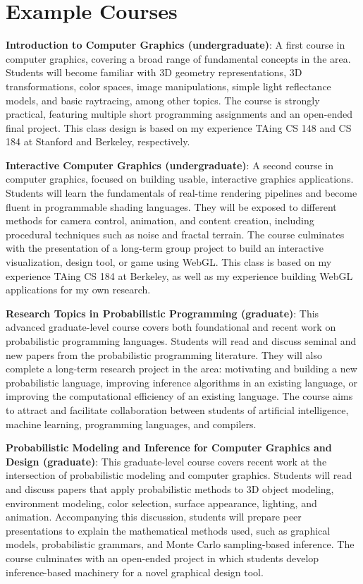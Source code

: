 \documentclass[
10pt, %
a4paper, %
oneside, %
headinclude,footinclude, %
BCOR5mm, %
]{scrartcl}
\begin{document}
\section*{Example Courses}

\textbf{Introduction to Computer Graphics (undergraduate)}:
A first course in computer graphics, covering a broad range of fundamental concepts in the area. Students will become familiar with 3D geometry representations, 3D transformations, color spaces, image manipulations, simple light reflectance models, and basic raytracing, among other topics. The course is strongly practical, featuring multiple short programming assignments and an open-ended final project. This class design is based on my experience TAing CS 148 and CS 184 at Stanford and Berkeley, respectively.

\textbf{Interactive Computer Graphics (undergraduate)}:
A second course in computer graphics, focused on building usable, interactive graphics applications. Students will learn the fundamentals of real-time rendering pipelines and become fluent in programmable shading languages. They will be exposed to different methods for camera control, animation, and content creation, including procedural techniques such as noise and fractal terrain. The course culminates with the presentation of a long-term group project to build an interactive visualization, design tool, or game using WebGL. This class is based on my experience TAing CS 184 at Berkeley, as well as my experience building WebGL applications for my own research.

\textbf{Research Topics in Probabilistic Programming (graduate)}:
This advanced graduate-level course covers both foundational and recent work on probabilistic programming languages. Students will read and discuss seminal and new papers from the probabilistic programming literature. They will also complete a long-term research project in the area: motivating and building a new probabilistic language, improving inference algorithms in an existing language, or improving the computational efficiency of an existing language. The course aims to attract and facilitate collaboration between students of artificial intelligence, machine learning, programming languages, and compilers.

\textbf{Probabilistic Modeling and Inference for Computer Graphics and Design (graduate)}:
This graduate-level course covers recent work at the intersection of probabilistic modeling and computer graphics. Students will read and discuss papers that apply probabilistic methods to 3D object modeling, environment modeling, color selection, surface appearance, lighting, and animation. Accompanying this discussion, students will prepare peer presentations to explain the mathematical methods used, such as graphical models, probabilistic grammars, and Monte Carlo sampling-based inference. The course culminates with an open-ended project in which students develop inference-based machinery for a novel graphical design tool.
\end{document}

